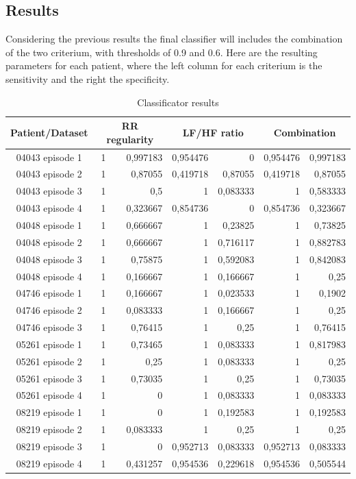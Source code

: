 \documentclass[a4paper,titlepage]{article}
\begin{document}
\subsection{Results}
Considering the previous results the final classifier will includes the combination of the two criterium, with thresholds of 0.9 and 0.6.
Here are the resulting parameters for each patient, where the left column for each criterium is the sensitivity and the right the specificity.

\begin{table}[htbp]
  \centering
  \caption{Classificator results}
    \begin{tabular}{c |rr|rr|rr|}
    \multicolumn{1}{c|}{Patient/Dataset} & \multicolumn{2}{c|}{RR regularity} & \multicolumn{2}{c|}{LF/HF ratio} & \multicolumn{2}{c|}{Combination} \\ \hline
    04043 episode 1 & 1     & 0,997183 & 0,954476 & 0     & 0,954476 & 0,997183 \\
    04043 episode 2 & 1     & 0,87055 & 0,419718 & 0,87055 & 0,419718 & 0,87055 \\
    04043 episode 3 & 1     & 0,5   & 1     & 0,083333 & 1     & 0,583333 \\
    04043 episode 4 & 1     & 0,323667 & 0,854736 & 0     & 0,854736 & 0,323667 \\
    04048 episode 1 & 1     & 0,666667 & 1     & 0,23825 & 1     & 0,73825 \\
    04048 episode 2 & 1     & 0,666667 & 1     & 0,716117 & 1     & 0,882783 \\
    04048 episode 3 & 1     & 0,75875 & 1     & 0,592083 & 1     & 0,842083 \\
    04048 episode 4 & 1     & 0,166667 & 1     & 0,166667 & 1     & 0,25 \\
    04746 episode 1 & 1     & 0,166667 & 1     & 0,023533 & 1     & 0,1902 \\
    04746 episode 2 & 1     & 0,083333 & 1     & 0,166667 & 1     & 0,25 \\
    04746 episode 3 & 1     & 0,76415 & 1     & 0,25  & 1     & 0,76415 \\
    05261 episode 1 & 1     & 0,73465 & 1     & 0,083333 & 1     & 0,817983 \\
    05261 episode 2 & 1     & 0,25  & 1     & 0,083333 & 1     & 0,25 \\
    05261 episode 3 & 1     & 0,73035 & 1     & 0,25  & 1     & 0,73035 \\
    05261 episode 4 & 1     & 0     & 1     & 0,083333 & 1     & 0,083333 \\
    08219 episode 1 & 1     & 0     & 1     & 0,192583 & 1     & 0,192583 \\
    08219 episode 2 & 1     & 0,083333 & 1     & 0,25  & 1     & 0,25 \\
    08219 episode 3 & 1     & 0     & 0,952713 & 0,083333 & 0,952713 & 0,083333 \\
    08219 episode 4 & 1     & 0,431257 & 0,954536 & 0,229618 & 0,954536 & 0,505544 \\


\end{tabular}
\end{table}
\end{document}
